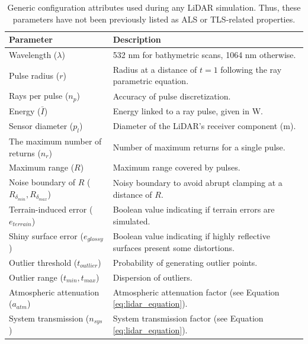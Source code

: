 \renewcommand{\arraystretch}{1.2}
\begin{table}
    \small
    \caption{Generic configuration attributes used during any LiDAR simulation. Thus, these parameters have not been previously listed as ALS or TLS-related properties.  }
    \label{table:lidar_workflow_parameters}
    \begin{tabular}{ll}
    \toprule
    \textbf{Parameter} & \textbf{Description}\\
    \midrule
    Wavelength ($\lambda$) & 532 \si{\nano\meter} for bathymetric scans, 1064 \si{\nano\meter} otherwise.\\
    Pulse radius ($r$) & Radius at a distance of $t = 1$ following the ray parametric equation. \\
    Rays per pulse ($n_{p}$) & Accuracy of pulse discretization. \\
    Energy ($\bar{I}$) & Energy linked to a ray pulse, given in \si{\watt}. \\
    Sensor diameter ($p_{l}$) & Diameter of the LiDAR's receiver component (\si{\meter}). \\
    The maximum number of returns ($n_{r}$) & Number of maximum returns for a single pulse. \\
    Maximum range ($R$) & Maximum range covered by pulses.\\
    Noise boundary of $R$ ($R_{\delta_{\textit{min}}}, R_{\delta_{\textit{max}}}$) & Noisy boundary to avoid abrupt clamping at a distance of $R$.\\
    Terrain-induced error ($e_{\textit{terrain}}$) & Boolean value indicating if terrain errors are simulated. \\
    Shiny surface error ($e_{\textit{glossy}}$) & Boolean value indicating if highly reflective surfaces present some distortions. \\
    Outlier threshold ($t_{\textit{outlier}}$) & Probability of generating outlier points. \\
    Outlier range ($t_{\textit{min}}, t_{\textit{max}}$) & Dispersion of outliers. \\
    Atmospheric attenuation ($a_{\textit{atm}}$) & Atmospheric attenuation factor (see Equation \ref{eq:lidar_equation}). \\
    System transmission ($n_{\textit{sys}}$) & System transmission factor (see Equation \ref{eq:lidar_equation}). \\
    \bottomrule
    \end{tabular}
    \libertineNormal
\end{table}
\renewcommand{\arraystretch}{1}

